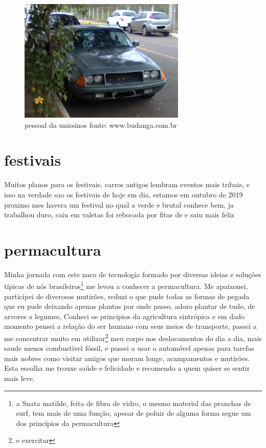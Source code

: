 \documentclass[a4paper]{report}
\begin{document}
\begin{figure}[!htb]
\centering
\includegraphics{Foto0295}
\caption{pessoal da unissinos fonte: www.budanga.com.br}
\label{Blog do pessoal da Tecnosinos }
\end{figure}
\clearpage



\section*{festivais}
	Muitos planos para os festivais, carros antigos lembram eventos mais tribais, e isso na verdade sao os festivais de hoje em dia, 
        estamos em outubro de 2019 proximo mes havera um festival no qual a verde e brutal conhece bem, ja trabalhou duro, caiu em valetas
        foi rebocada por fitas de e saiu mais feliz 

\section*{permacultura}
	Minha jornada com este naco de tecnologia formado por diversas ideias e solu\c{c}\~oes t\'ipicas de n\'os brasileiros\footnote{ a Snata matilde, feita de fibra de vidro, o mesmo material das pranchas de surf, tem mais de uma fun\c{c}\~ao, apesar de poluir de alguma forma segue um dos princ\'ipios da permacultura } me levou a conhecer a permacultura.
 	Me apaixonei, participei de diverosos mutir\~oes, reduzi o que pude todas as formas de pegada que eu pude deixando apenas plantas por onde passo, adoro plantar de tudo, de arvores a legumes,
        Conheci os principios da agricultura sintr\'opica e em dado momento pensei a rela\c{c}\~ao do ser humano com seus meios de transporte, passei a me concentrar muito em utilizar\footnote{e exercitar} meu corpo nos deslocamentos do dia a dia, mais saude menos combustivel f\'ossil, e passei a usar o autom\'ovel apenas para tarefas mais nobres como visitar amigos que moram longe, acampamentos e mutir\~oes.
	Esta escolha me trouxe sa\'ude e felicidade e recomendo a quem quiser se sentir mais leve. 
\end{document}
